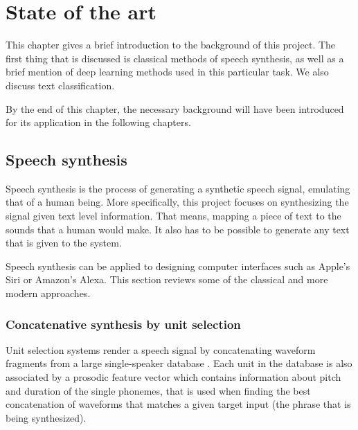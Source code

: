 \chapter{State of the art}

This chapter gives a brief introduction to the background of this project. The first thing that is discussed is classical methods of speech synthesis, as well as a brief mention of deep learning methods used in this particular task. We also discuss text classification.

By the end of this chapter, the necessary background will have been introduced for its application in the following chapters.

\section{Speech synthesis}

Speech synthesis is the process of generating a synthetic speech signal, emulating that of a human being. More specifically, this project focuses on synthesizing the signal given text level information. That means, mapping a piece of text to the sounds that a human would make. It also has to be possible to generate any text that is given to the system.


Speech synthesis can be applied to designing computer interfaces such as Apple's Siri or Amazon's Alexa. This section reviews some of the classical and more modern approaches.


\subsection{Concatenative synthesis by unit selection} \label{sec:concat}

Unit selection systems render a speech signal by concatenating waveform fragments from a large single-speaker database \cite{hunt1996unit}. Each unit in the database is also associated by a prosodic feature vector which contains information about pitch and duration of the single phonemes, that is used when finding the best concatenation of waveforms that matches a given target input (the phrase that is being synthesized).

